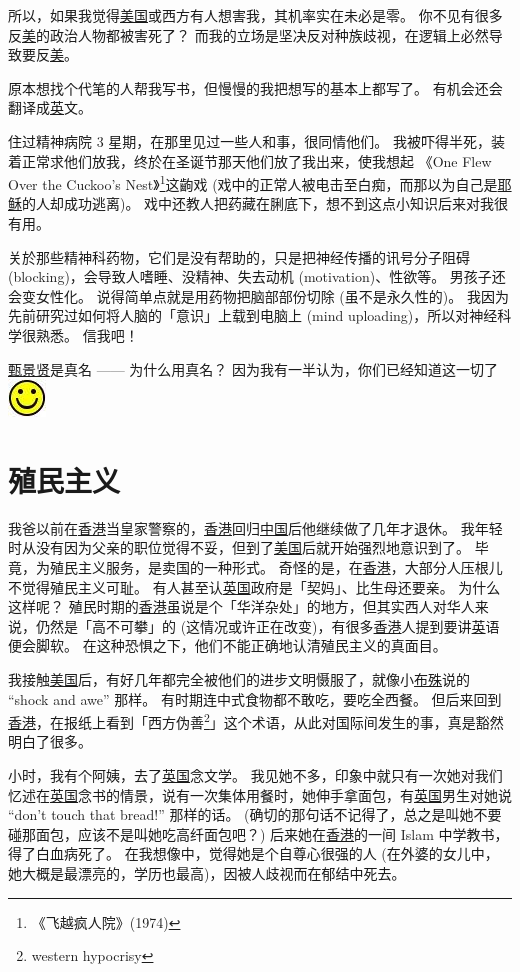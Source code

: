 \documentclass[12pt]{report}
\newcommand*\smiley{\includegraphics[scale=0.5]{smiley.jpg}}
\begin{document}
所以，如果我觉得\uline{美国}或西方有人想害我，其机率实在未必是零。 你不见有很多反\uline{美}的政治人物都被害死了？ 而我的立场是坚决反对种族歧视，在逻辑上必然导致要反\uline{美}。

原本想找个代笔的人帮我写书，但慢慢的我把想写的基本上都写了。  有机会还会翻译成\uline{英}文。

住过精神病院 3 星期，在那里见过一些人和事，很同情他们。 我被吓得半死，装着正常求他们放我，终於在圣诞节那天他们放了我出来，使我想起 《One Flew Over the Cuckoo's Nest》\footnote{《飞越疯人院》(1974)}这齣戏 (戏中的正常人被电击至白痴，而那以为自己是\uline{耶稣}的人却成功逃离)。 戏中还教人把药藏在脷底下，想不到这点小知识后来对我很有用。

关於那些精神科药物，它们是没有帮助的，只是把神经传播的讯号分子阻碍 (blocking)，会导致人嗜睡、没精神、失去动机 (motivation)、性欲等。 男孩子还会变女性化。 说得简单点就是用药物把脑部部份切除 (虽不是永久性的)。 我因为先前研究过如何将人脑的「意识」上载到电脑上 (mind uploading)，所以对神经科学很熟悉。 信我吧！

\uline{甄景贤}是真名 —— 为什么用真名？ 因为我有一半认为，你们已经知道这一切了 \smiley

\chapter{殖民主义}

我爸以前在\uline{香港}当皇家警察的，\uline{香港}回归\uline{中国}后他继续做了几年才退休。 我年轻时从没有因为父亲的职位觉得不妥，但到了\uline{美国}后就开始强烈地意识到了。 毕竟，为殖民主义服务，是卖国的一种形式。 奇怪的是，在\uline{香港}，大部分人压根儿不觉得殖民主义可耻。 有人甚至认\uline{英国}政府是「契妈」、比生母还要亲。 为什么这样呢？ 殖民时期的\uline{香港}虽说是个「华洋杂处」的地方，但其实西人对华人来说，仍然是「高不可攀」的 (这情况或许正在改变)，有很多\uline{香港}人提到要讲\uline{英}语便会脚软。 在这种恐惧之下，他们不能正确地认清殖民主义的真面目。

我接触\uline{美国}后，有好几年都完全被他们的进步文明慑服了，就像小\uline{布殊}说的 ``shock and awe'' 那样。 有时期连中式食物都不敢吃，要吃全西餐。 但后来回到\uline{香港}，在报纸上看到「西方伪善\footnote{western hypocrisy}」这个术语，从此对国际间发生的事，真是豁然明白了很多。

小时，我有个阿姨，去了\uline{英国}念文学。 我见她不多，印象中就只有一次她对我们忆述在\uline{英国}念书的情景，说有一次集体用餐时，她伸手拿面包，有\uline{英国}男生对她说 ``don't touch that bread!'' 那样的话。 (确切的那句话不记得了，总之是叫她不要碰那面包，应该不是叫她吃高纤面包吧？) 后来她在\uline{香港}的一间 Islam 中学教书，得了白血病死了。 在我想像中，觉得她是个自尊心很强的人 (在外婆的女儿中，她大概是最漂亮的，学历也最高)，因被人歧视而在郁结中死去。
\end{document}
